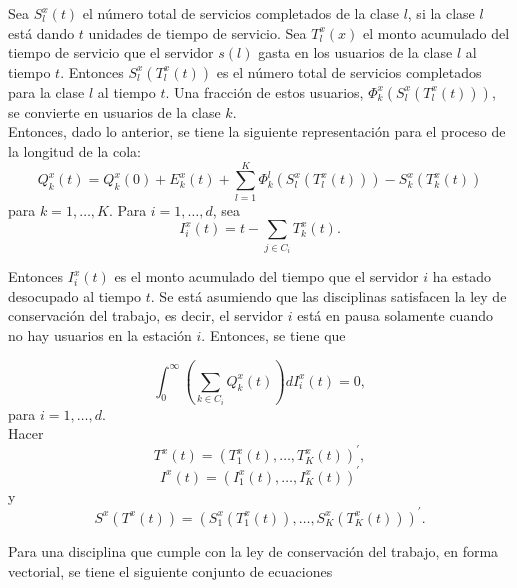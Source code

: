 Sea $S_{l}^{x}\left(t\right)$ el n\'umero total de servicios
completados de la clase $l$, si la clase $l$ est\'a dando $t$
unidades de tiempo de servicio. Sea $T_{l}^{x}\left(x\right)$ el
monto acumulado del tiempo de servicio que el servidor
$s\left(l\right)$ gasta en los usuarios de la clase $l$ al tiempo
$t$. Entonces $S_{l}^{x}\left(T_{l}^{x}\left(t\right)\right)$ es
el n\'umero total de servicios completados para la clase $l$ al
tiempo $t$. Una fracci\'on de estos usuarios,
$\Phi_{k}^{x}\left(S_{l}^{x}\left(T_{l}^{x}\left(t\right)\right)\right)$,
se convierte en usuarios de la clase $k$.\\

Entonces, dado lo anterior, se tiene la siguiente representaci\'on
para el proceso de la longitud de la cola:\\

\begin{equation}
Q_{k}^{x}\left(t\right)=Q_{k}^{x}\left(0\right)+E_{k}^{x}\left(t\right)+\sum_{l=1}^{K}\Phi_{k}^{l}\left(S_{l}^{x}\left(T_{l}^{x}\left(t\right)\right)\right)-S_{k}^{x}\left(T_{k}^{x}\left(t\right)\right)
\end{equation}
para $k=1,\ldots,K$. Para $i=1,\ldots,d$, sea
\[I_{i}^{x}\left(t\right)=t-\sum_{j\in C_{i}}T_{k}^{x}\left(t\right).\]

Entonces $I_{i}^{x}\left(t\right)$ es el monto acumulado del
tiempo que el servidor $i$ ha estado desocupado al tiempo $t$. Se
est\'a asumiendo que las disciplinas satisfacen la ley de
conservaci\'on del trabajo, es decir, el servidor $i$ est\'a en
pausa solamente cuando no hay usuarios en la estaci\'on $i$.
Entonces, se tiene que

\begin{equation}
\int_{0}^{\infty}\left(\sum_{k\in
C_{i}}Q_{k}^{x}\left(t\right)\right)dI_{i}^{x}\left(t\right)=0,
\end{equation}
para $i=1,\ldots,d$.\\

Hacer
\[T^{x}\left(t\right)=\left(T_{1}^{x}\left(t\right),\ldots,T_{K}^{x}\left(t\right)\right)^{'},\]
\[I^{x}\left(t\right)=\left(I_{1}^{x}\left(t\right),\ldots,I_{K}^{x}\left(t\right)\right)^{'}\]
y
\[S^{x}\left(T^{x}\left(t\right)\right)=\left(S_{1}^{x}\left(T_{1}^{x}\left(t\right)\right),\ldots,S_{K}^{x}\left(T_{K}^{x}\left(t\right)\right)\right)^{'}.\]

Para una disciplina que cumple con la ley de conservaci\'on del
trabajo, en forma vectorial, se tiene el siguiente conjunto de
ecuaciones

